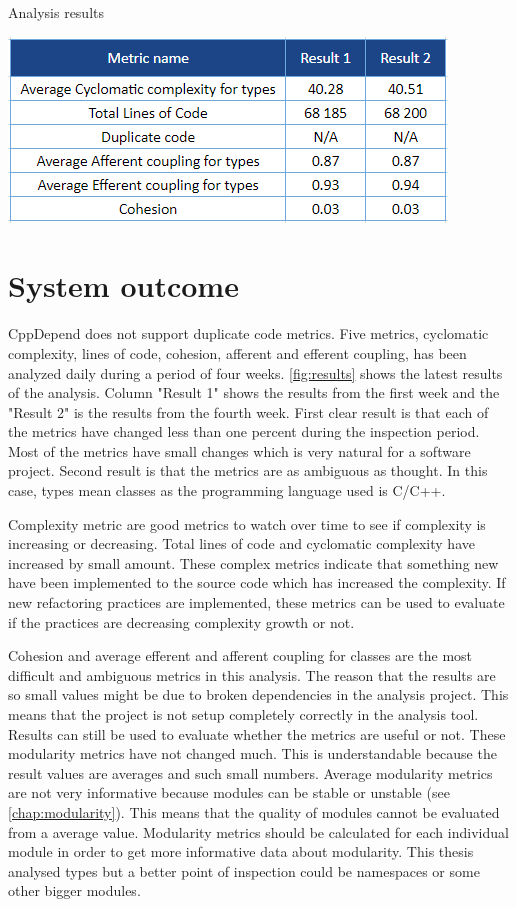 \begin{table}[t!]
\centering
\caption{Analysis results}
\includegraphics[scale=1]{results.png}
\label{fig:results}
\end{table}

\section{System outcome}
CppDepend does not support duplicate code metrics. Five metrics, cyclomatic complexity, lines of code, cohesion, afferent and efferent coupling, has been analyzed daily during a period of four weeks. \autoref{fig:results} shows the latest results of the analysis. Column "Result 1" shows the results from the first week and the "Result 2" is the results from the fourth week. First clear result is that each of the metrics have changed less than one percent during the inspection period. Most of the metrics have small changes which is very natural for a software project. Second result is that the metrics are as ambiguous as thought. In this case, types mean classes as the programming language used is C/C++. 

Complexity metric are good metrics to watch over time to see if complexity is increasing or decreasing. Total lines of code and cyclomatic complexity have increased by small amount. These complex metrics indicate that something new have been implemented to the source code which has increased the complexity. If new refactoring practices are implemented, these metrics can be used to evaluate if the practices are decreasing complexity growth or not. 

Cohesion and average efferent and afferent coupling for classes are the most difficult and ambiguous metrics in this analysis. The reason that the results are so small values might be due to broken dependencies in the analysis project. This means that the project is not setup completely correctly in the analysis tool. Results can still be used to evaluate whether the metrics are useful or not. These modularity metrics have not changed much. This is understandable because the result values are averages and such small numbers. Average modularity metrics are not very informative because modules can be stable or unstable (see \autoref{chap:modularity}). This means that the quality of modules cannot be evaluated from a average value. Modularity metrics should be calculated for each individual module in order to get more informative data about modularity. This thesis analysed types but a better point of inspection could be namespaces or some other bigger modules.


